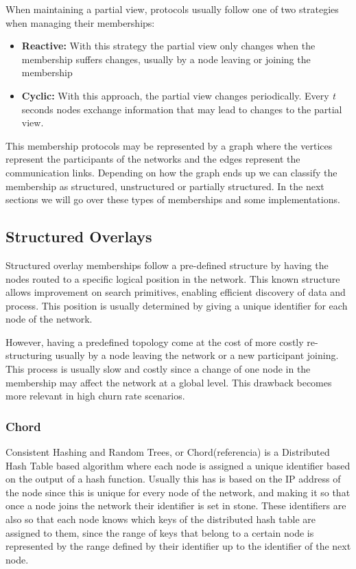 When maintaining a partial view, protocols usually follow one of two strategies
when managing their memberships:

\begin{itemize}
  \item \textbf{Reactive:} With this strategy the partial view only changes when
the membership suffers changes, usually by a node leaving or joining the membership
  \item \textbf{Cyclic:} With this approach, the partial view changes periodically.
Every \textit{t} seconds nodes exchange information that may lead to changes to the
partial view.
\end{itemize}

This membership protocols may be represented by a graph where the vertices represent
the participants of the networks and the edges represent the communication links.
Depending on how the graph ends up we can classify the membership as structured,
unstructured or partially structured. In the next sections we will go over these
types of memberships and some implementations.

\subsection{Structured Overlays}
\label{sub:structured_overlays}

Structured overlay memberships follow a pre-defined structure by having the nodes
routed to a specific logical position in the network. This known structure allows
improvement on search primitives, enabling efficient discovery of data and process.
This position is usually determined by giving a unique identifier for each node of the
network.

However, having a predefined topology come at the cost of more costly re-structuring
usually by a node leaving the network or a new participant joining. This process
is usually slow and costly since a change of one node in the membership may affect
the network at a global level. This drawback becomes more relevant in high churn rate
scenarios.

\subsubsection{Chord}
\label{subsec:chord}

Consistent Hashing and Random Trees, or Chord(referencia) is a Distributed Hash
Table based algorithm where each node is assigned a unique identifier based on
the output of a hash function. Usually this has is based on the IP address of
the node since this is unique for every node of the network, and making it so
that once a node joins the network their identifier is set in stone. These
identifiers are also so that each node knows which keys of the distributed hash
table are assigned to them, since the range of keys that belong to a certain
node is represented by the range defined by their identifier up to the
identifier of the next node.

